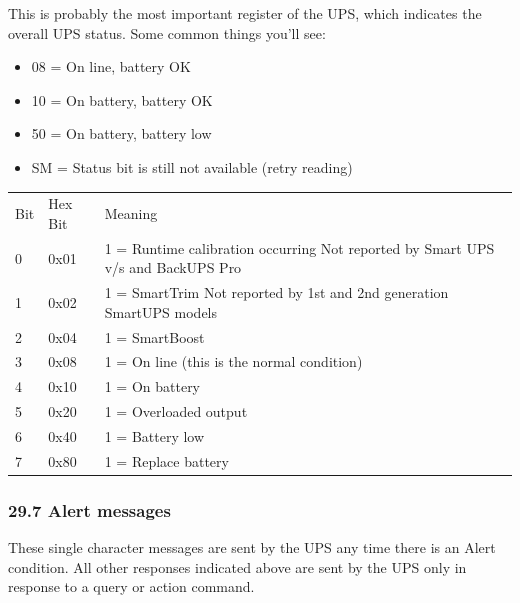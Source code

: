This is probably the most important register of the UPS, which indicates the
overall UPS status. Some common things you'll see:  

\begin{itemize}
\item 08 = On line, battery OK  
\item 10 = On battery, battery OK  
\item 50 = On battery, battery low  
\item SM = Status bit is still not available (retry reading) 
\end{itemize}

\begin{longtable}{lll}
{Bit} & {Hex Bit} & {Meaning 
 } \\
{0} & {0x01} & {1 = Runtime calibration occurring Not reported by Smart UPS
v/s and BackUPS Pro 
 } \\
{1} & {0x02} & {1 = SmartTrim Not reported by 1st and 2nd generation SmartUPS
models 
 } \\
{2} & {0x04} & {1 = SmartBoost 
 } \\
{3} & {0x08} & {1 = On line (this is the normal condition) 
 } \\
{4} & {0x10} & {1 = On battery 
 } \\
{5} & {0x20} & {1 = Overloaded output 
 } \\
{6} & {0x40} & {1 = Battery low 
 } \\
{7} & {0x80} & {1 = Replace battery  
}

\end{longtable}

\label{Alert-messages}

\subsubsection*{29.7 Alert messages}

These single character messages are sent by the UPS any time there is an Alert
condition. All other responses indicated above are sent by the UPS only in
response to a query or action command.  

